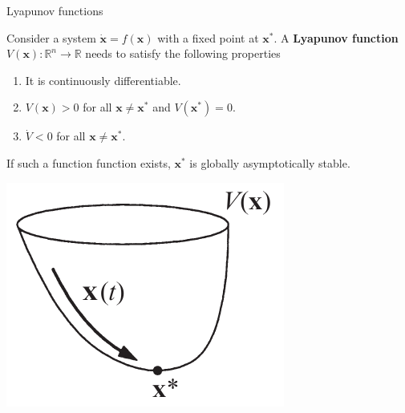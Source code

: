 \documentclass[usenames,dvipsnames,svgnames,10pt,aspectratio=169]{beamer}
\begin{document}
\begin{frame}[t, c]{Lyapunov functions}{}
  \begin{minipage}{.68\textwidth}
    Consider a system $\dot{\bm{x}} = f(\bm{x})$ with a fixed point at $\bm{x}^*$.
    A \alert{\textbf{Lyapunov function}} $V(\bm{x}) : \mathbb{R}^n \to \mathbb{R}$ needs to satisfy the following properties
    \begin{enumerate}
    \item It is continuously differentiable.
    \item $V(\bm{x}) > 0$ for all $\bm{x} \neq \bm{x}^*$ and $V(\bm{x}^*) = 0$.
    \item $\dot{V} < 0$ for all $\bm{x} \neq \bm{x}^*$.
    \end{enumerate}
    If such a function function exists, $\bm{x}^*$ is globally asymptotically stable.
  \end{minipage}%
  \hfill
  \begin{minipage}{.28\textwidth}
    \centering
    \includegraphics[width=\textwidth]{lyapunov}
  \end{minipage}
\end{frame}

\frame{}
\end{document}
